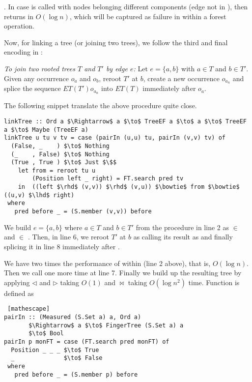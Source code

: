 . In case  is called with nodes belonging different components (edge not in ), then  returns  in $O(\log n)$, which will be captured as failure in \cut within a forest operation.


Now, for linking a tree (or joining two trees), we follow the third and final encoding in \cite{Rand-DynGs-Algos}:
\begin{displayquote}
\emph{To join two rooted trees $T$ and $T'$ by edge $e$:} Let $e = \{a,b\}$ with $a \in T$ and $b \in T'$. Given any  occurrence $o_a$ and $o_b$, reroot $T'$ at $b$, create a new occurrence $o_{a_n}$ and splice the sequence $ET(T')o_{a_n}$ into $ET(T)$ immediately after $o_a$.
\end{displayquote} 

The following snippet translate the above procedure quite close. 
\begin{lstlisting}[mathescape]
linkTree :: Ord a $\Rightarrow$ a $\to$ TreeEF a $\to$ a $\to$ TreeEF a $\to$ Maybe (TreeEF a) 
linkTree u tu v tv = case (pairIn (u,u) tu, pairIn (v,v) tv) of
  (False, _    ) $\to$ Nothing
  (_    , False) $\to$ Nothing 
  (True , True ) $\to$ Just $\$$
    let from = reroot tu u
        (Position left _ right) = FT.search pred tv
    in  ((left $\rhd$ (v,v)) $\rhd$ (v,u)) $\bowtie$ from $\bowtie$ ((u,v) $\lhd$ right)
 where
   pred before _ = (S.member (v,v)) before
\end{lstlisting} 

We build $e = \{a,b\}$ where $a \in T$ and $b \in T'$ from the procedure in line 2 as  $\in$  and  $\in$ .  Then, in line 6, we reroot $T'$ at $b$ as  calling its result as  and finally splicing it in line 8 immediately after . 

 We have two times the performance of  within  (line 2 above), that is, $O(\log n)$. Then we call  one more time at line 7. Finally we build up the resulting tree by applying $\lhd$ and $\rhd$ taking $O(1)$ and $\bowtie$ taking $O(\log n^2)$ time. Function  is defined as 
\begin{lstlisting} [mathescape]
pairIn :: (Measured (S.Set a) a, Ord a)
       $\Rightarrow$ a $\to$ FingerTree (S.Set a) a
       $\to$ Bool
pairIn p monFT = case (FT.search pred monFT) of
  Position _ _ _ $\to$ True 
  _              $\to$ False
 where
   pred before _ = (S.member p) before 
\end{lstlisting} 


